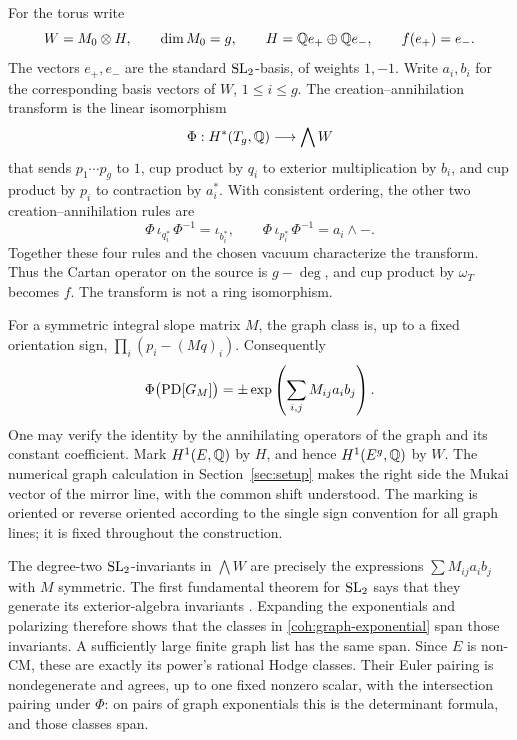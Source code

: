 For the torus write
\[
 W=M_0\otimes H,\qquad \dim M_0=g,\qquad
 H=\mathbb Q e_+\oplus\mathbb Q e_-,\qquad f(e_+)=e_-.
\]
The vectors \(e_+,e_-\) are the standard \(\operatorname{SL}_2\)-basis, of weights
\(1,-1\).  Write \(a_i,b_i\) for the corresponding basis vectors of
\(W\), \(1\le i\le g\).  The creation--annihilation transform is the
linear isomorphism
\begin{equation}\label{coh:transform}
 \Phi:H^*(T_g,\mathbb Q)\longrightarrow\bigwedge W
\end{equation}
that sends \(p_1\cdots p_g\) to \(1\), cup product by \(q_i\) to
exterior multiplication by \(b_i\), and cup product by \(p_i\) to
contraction by \(a_i^*\).  With consistent ordering, the other two
creation--annihilation rules are
\[
 \Phi\,\iota_{q_i^*}\,\Phi^{-1}=\iota_{b_i^*},
 \qquad
 \Phi\,\iota_{p_i^*}\,\Phi^{-1}=a_i\wedge-.
\]
Together these four rules and the chosen vacuum characterize the
transform.  Thus the Cartan
operator on the source is \(g-\deg\), and cup product by
\(\omega_T\) becomes \(f\).  The transform is not a ring isomorphism.

For a symmetric integral slope matrix \(M\), the graph class is, up
to a fixed orientation sign, \(\prod_i(p_i-(Mq)_i)\).  Consequently
\begin{equation}\label{coh:graph-exponential}
 \Phi\bigl(\operatorname{PD}[G_M]\bigr)
 =\pm\exp\left(\sum_{i,j}M_{ij}a_i b_j\right).
\end{equation}
One may verify the identity by the annihilating operators of the graph
and its constant coefficient.  Mark \(H^1(E,\mathbb Q)\) by \(H\), and hence
\(H^1(E^g,\mathbb Q)\) by \(W\).  The numerical graph calculation in
Section~\ref{sec:setup} makes the right side the Mukai vector of the
mirror line, with the common shift understood.  The marking is oriented
or reverse oriented according to the single sign convention for all
graph lines; it is fixed throughout the construction.

The degree-two \(\operatorname{SL}_2\)-invariants in \(\bigwedge W\) are precisely
the expressions \(\sum M_{ij}a_i b_j\) with \(M\) symmetric.  The
first fundamental theorem for \(\operatorname{SL}_2\) says that they generate its
exterior-algebra invariants \cite{WeylClassicalGroups}.  Expanding the exponentials and polarizing
therefore shows that the classes in
\eqref{coh:graph-exponential} span those invariants.  A sufficiently
large finite graph list has the same span.  Since \(E\) is non-CM,
these are exactly its power's rational Hodge classes.  Their Euler
pairing is nondegenerate and agrees, up to one fixed nonzero scalar,
with the intersection pairing under \(\Phi\): on pairs of graph
exponentials this is the determinant formula, and those classes span.

